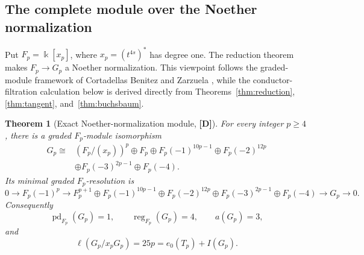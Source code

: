 \documentclass[11pt]{article}
\newtheorem{theorem}{Theorem}[section]
\theoremstyle{definition}
\theoremstyle{remark}
\newcommand{\kfield}{\Bbbk}
\begin{document}
\subsection{The complete module over the Noether normalization}

Put $F_p=\kfield[x_p]$, where $x_p=(t^{4s})^*$ has degree one. The reduction theorem makes
$F_p\to G_p$ a Noether normalization. This viewpoint follows the graded-module framework of
Cortadellas Benitez and Zarzuela \cite{CortadellasZarzuela2007,CortadellasZarzuela2009}, while the
conductor-filtration calculation below is derived directly from Theorems~\ref{thm:reduction},
\ref{thm:tangent}, and~\ref{thm:buchsbaum}.

\begin{theorem}[Exact Noether-normalization module, {\bf[D]}]
\label{thm:module}
For every integer $p\ge4$, there is a graded $F_p$-module isomorphism
\begin{align*}
G_p\cong{}& (F_p/(x_p))^p\oplus F_p\oplus F_p(-1)^{10p-1}\oplus F_p(-2)^{12p}\\
&\oplus F_p(-3)^{2p-1}\oplus F_p(-4).
\end{align*}
Its minimal graded $F_p$-resolution is
\[
0\longrightarrow F_p(-1)^p\longrightarrow
F_p^{p+1}\oplus F_p(-1)^{10p-1}\oplus F_p(-2)^{12p}
\oplus F_p(-3)^{2p-1}\oplus F_p(-4)
\longrightarrow G_p\longrightarrow0.
\]
Consequently
\[
\operatorname{pd}_{F_p}(G_p)=1,
\qquad \operatorname{reg}_{F_p}(G_p)=4,
\qquad a(G_p)=3,
\]
and
\[
\ell(G_p/x_pG_p)=25p=e_0(T_p)+I(G_p).
\]
\end{theorem}
\end{document}
